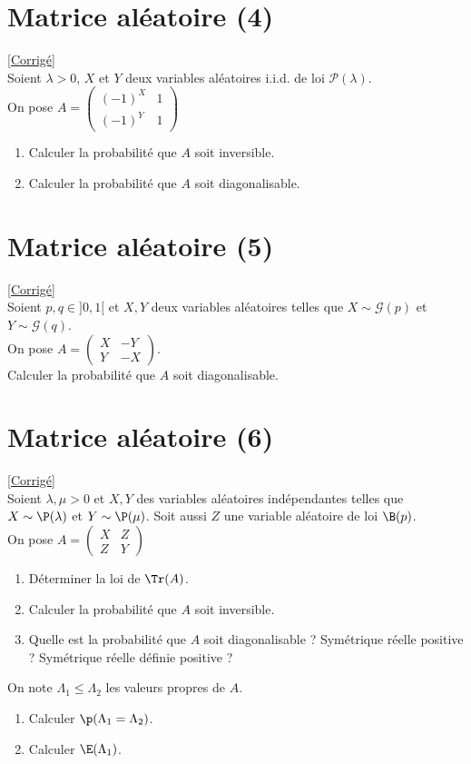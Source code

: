 \documentclass[8pt]{book}
\begin{document}
\section{Matrice aléatoire (4)}
\textcolor{blue}{\hyperref[Matrice aléatoire 4 corrigé]{[Corrigé]}}\\
\label{Matrice aléatoire 4}
Soient $\lambda >0$, $X$ et $Y$ deux variables aléatoires i.i.d. de loi $\mathcal P(\lambda)$.\\
On pose $A=\begin{pmatrix}
	(-1)^X&1\\
	(-1)^Y&1
\end{pmatrix}$
\begin{enumerate}
	\item Calculer la probabilité que $A$ soit inversible.
	\item Calculer la probabilité que $A$ soit diagonalisable.
\end{enumerate}

\section{Matrice aléatoire (5)}
\label{Matrice aléatoire 5}
\textcolor{blue}{\hyperref[Matrice aléatoire 5 corrigé]{[Corrigé]}}\\
Soient $p,q\in ]0,1[$ et $X,Y$ deux variables aléatoires telles que $X\sim\mathcal G(p)$ et $Y\sim\mathcal G(q)$.\\
On pose $A=\begin{pmatrix}
	X&-Y\\
	Y&-X
\end{pmatrix}$.\\
Calculer la probabilité que $A$ soit diagonalisable.

\section{Matrice aléatoire (6)}
\label{Matrice aléatoire 6}
\textcolor{blue}{\hyperref[Matrice aléatoire 6 corrigé]{[Corrigé]}}\\
Soient $\lambda,\mu>0$ et $X,Y$ des variables aléatoires indépendantes telles que $X\sim\P(\lambda)$ et $Y\sim\P(\mu)$. Soit aussi $Z$ une variable aléatoire de loi $\B(p)$.\\
On pose $A=\begin{pmatrix}
	X&Z\\
	Z&Y
\end{pmatrix}$
\begin{enumerate}
	\item Déterminer la loi de $\Tr(A)$.
	\item Calculer la probabilité que $A$ soit inversible.
	\item Quelle est la probabilité que $A$ soit diagonalisable ? Symétrique réelle positive ? Symétrique réelle définie positive ?
\end{enumerate}
On note $\Lambda_1\leq \Lambda_2$ les valeurs propres de $A$.
\begin{enumerate}[resume]
	\item Calculer $\p(\Lambda_1=\Lambda_2)$.
	\item Calculer $\E(\Lambda_1)$.
\end{enumerate}
\end{document}
